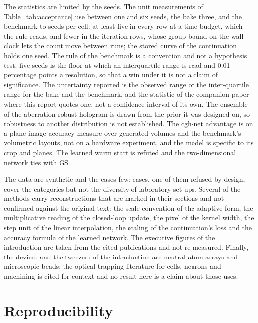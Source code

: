 The statistics are limited by the seeds. The unit measurements of Table~\ref{tab:acceptance} use between one and six seeds, the bake three, and the benchmark \benchSeedsMin{} to \benchSeedsMax{} seeds per cell: at least five in every row at a time budget, which the rule reads, and fewer in the iteration rows, whose group bound on the wall clock lets the count move between runs; the stored curve of the continuation holds one seed. The rule of the benchmark is a convention and not a hypothesis test: five seeds is the floor at which an interquartile range is read and 0.01 percentage points a resolution, so that a win under it is not a claim of significance. The uncertainty reported is the observed range or the inter-quartile range for the bake and the benchmark, and the statistic of the companion paper where this report quotes one, not a confidence interval of its own. The ensemble of the aberration-robust hologram is drawn from the prior it was designed on, so robustness to another distribution is not established. The cgh-net advantage is on a plane-image accuracy measure over generated volumes and the benchmark's volumetric layouts, not on a hardware experiment, and the model is specific to its crop and planes. The learned warm start is refuted and the two-dimensional network ties with GS.

The data are synthetic and the cases few: \nCases{} cases, one of them refused by design, cover the categories but not the diversity of laboratory set-ups. Several of the methods carry reconstructions that are marked in their sections and not confirmed against the original text: the scale convention of the adaptive form, the multiplicative reading of the closed-loop update, the pixel of the kernel width, the step unit of the linear interpolation, the scaling of the continuation's loss and the accuracy formula of the learned network. The executive figures of the introduction are taken from the cited publications and not re-measured. Finally, the devices and the tweezers of the introduction are neutral-atom arrays and microscopic beads; the optical-trapping literature for cells, neurons and machining is cited for context and no result here is a claim about those uses.

\section{Reproducibility}\label{sec:reproducibility}

